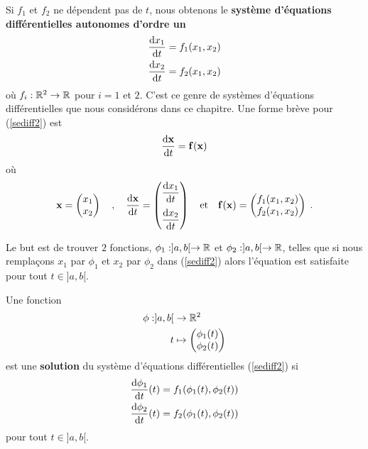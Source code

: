{Si $f_1$ et $f_2$ ne dépendent pas de $t$, nous obtenons le
{\bfseries système d'équations différentielles autonomes
d'ordre un}
\begin{equation} \label{sediff2}
\begin{split}
\frac{\mathrm{d}x_1}{\mathrm{d}t} &= f_1(x_1,x_2) \\
\frac{\mathrm{d}x_2}{\mathrm{d}t} &= f_2(x_1,x_2)
\end{split}
\end{equation}
où $f_i:\mathbb{R}^2 \rightarrow \mathbb{R}$ pour $i=1$ et $2$.  C'est ce genre de
systèmes d'équations différentielles que nous considérons dans ce
chapitre.  Une forme brève pour (\ref{sediff2}) est
\begin{equation} \label{sediff3}
\frac{\mathrm{d}\mathbf{x}}{\mathrm{d}t} = \mathbf{f}(\mathbf{x})
\end{equation}
où
\[
\mathbf{x} = \begin{pmatrix} x_1 \\ x_2 \end{pmatrix}
\quad , \quad
\frac{\mathrm{d}\mathbf{x}}{\mathrm{d}t} =
\begin{pmatrix} \displaystyle \frac{\mathrm{d}x_1}{\mathrm{d}t} \\[1em]
\displaystyle \frac{\mathrm{d}x_2}{\mathrm{d}t} \end{pmatrix}
\quad \text{et} \quad
\mathbf{f}(\mathbf{x}) = \begin{pmatrix} f_1(x_1,x_2)\\
f_2(x_1,x_2)
\end{pmatrix} \; .
\]

Le but est de trouver $2$ fonctions, $\phi_1:]a,b[ \rightarrow \mathbb{R}$ et
$\phi_2:]a,b[ \rightarrow \mathbb{R}$, telles que si nous remplaçons $x_1$ par
$\phi_1$ et $x_2$ par $\phi_2$ dans (\ref{sediff2}) alors l'équation
est satisfaite pour tout $t \in ]a,b[$.

\begin{defn} 
Une fonction
\begin{align*}
\phi:]a,b[ & \rightarrow \mathbb{R}^2 \\
t &\mapsto
\begin{pmatrix}
\phi_1(t) \\ \phi_2(t)
\end{pmatrix}
\end{align*}
est une {\bfseries solution} du système d'équations différentielles
(\ref{sediff2}) si
\[
\begin{split}
\frac{\mathrm{d}\phi_1}{\mathrm{d}t}(t) &= f_1(\phi_1(t),\phi_2(t)) \\
\frac{\mathrm{d}\phi_2}{\mathrm{d}t}(t) &= f_2(\phi_1(t),\phi_2(t))
\end{split}
\]
pour tout $t \in]a,b[$.
\end{defn}

}
